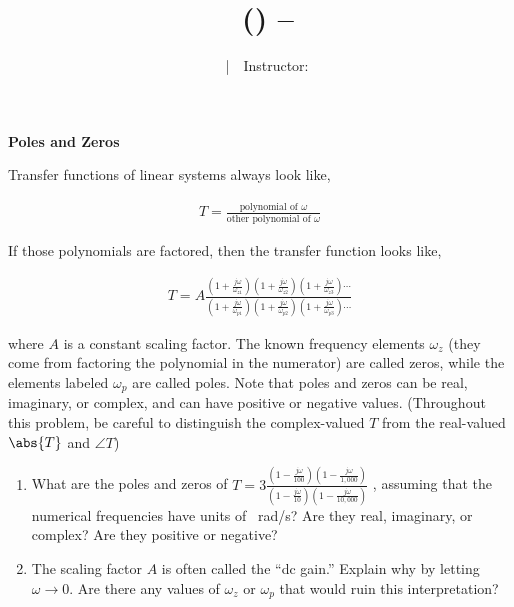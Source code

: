 \documentclass[11pt]{article}
\title{\coursename~(\coursecode) -- \lecturetitle}
\author{\notetaker~~|~~Instructor: \instructor}
\date{\term}
\begin{document}
  
\maketitle
\pagebreak

\setcounter{section}{10}

\begin{problem}

\textbf{Poles and Zeros}

Transfer functions of linear systems always look like,

\begin{align*}
T = \frac{\text{polynomial of } \omega}{\text{other polynomial of } \omega}
\end{align*}

If those polynomials are factored, then the transfer function looks like,

\begin{align*}
T = A \frac{\left( 1 + \frac{j \omega}{\omega _{z1}} \right)\left( 1 + \frac{j \omega}{\omega _{z2}} \right)\left( 1 + \frac{j \omega}{\omega _{z3}} \right) \cdots}{\left( 1 + \frac{j \omega}{\omega _{p1}} \right)\left( 1 + \frac{j \omega}{\omega _{p2}} \right)\left( 1 + \frac{j \omega}{\omega _{p3}} \right) \cdots}
\end{align*}

where $A$ is a constant scaling factor. The known frequency elements $\omega_z$ (they come from factoring the
polynomial in the numerator) are called zeros, while the elements labeled $\omega_p$ are called poles. Note that
poles and zeros can be real, imaginary, or complex, and can have positive or negative values.
(Throughout this problem, be careful to distinguish the complex-valued $T$ from the real-valued $\abs{T}$ and
$\angle T$)

\begin{enumerate}[\alph*)]

\item

What are the poles and zeros of $T = 3 \frac{\left( 1 - \frac{j \omega}{100} \right)\left( 1 - \frac{j \omega}{1,000} \right)}{\left( 1 - \frac{j \omega}{10} \right)\left( 1 - \frac{j \omega}{10,000} \right)}$ , assuming that the numerical frequencies
have units of \SI{}{\radian / \second}? Are they real, imaginary, or complex? Are they positive or negative?

\item

The scaling factor $A$ is often called the ``dc gain.'' Explain why by letting $\omega \rightarrow 0$. Are there any
values of $\omega_z$ or $\omega_p$ that would ruin this interpretation?


\end{enumerate}
\end{problem}
\end{document}
